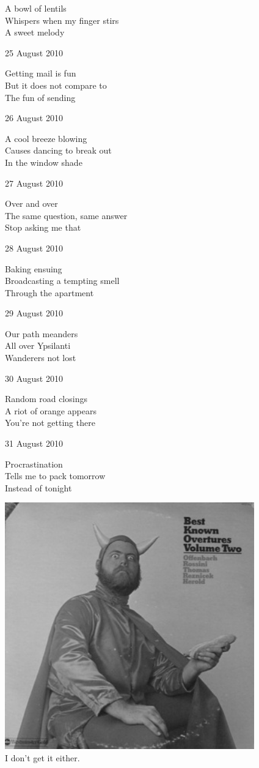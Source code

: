 \documentclass[12pt]{article}
\begin{document}
A bowl of lentils \\
Whispers when my finger stirs \\
A sweet melody

\newpage

25 August 2010

Getting mail is fun \\
But it does not compare to \\
The fun of sending

26 August 2010

A cool breeze blowing \\
Causes dancing to break out \\
In the window shade

27 August 2010

Over and over \\
The same question, same answer \\
Stop asking me that

28 August 2010

Baking ensuing \\
Broadcasting a tempting smell \\
Through the apartment

29 August 2010

Our path meanders \\
All over Ypsilanti \\
Wanderers not lost

30 August 2010

Random road closings \\
A riot of orange appears \\
You're not getting there

31 August 2010

Procrastination \\
Tells me to pack tomorrow \\
Instead of tonight

\newpage

\begin{center}
\includegraphics[width=4.25in]{album.jpg} \\[1cm]

I don't get it either.

\end{center}
\end{document}
